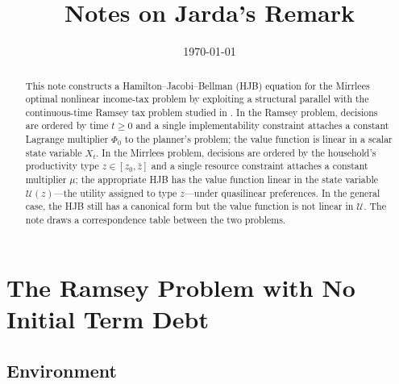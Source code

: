 \documentclass[12pt]{article}
\title{Notes on Jarda's Remark}
\date{\today}
\newcommand{\calU}{\mathcal{U}}
\begin{document}
\maketitle

\begin{abstract}
  This note constructs a Hamilton--Jacobi--Bellman (HJB) equation for the
  Mirrlees optimal nonlinear income-tax problem by exploiting a structural
  parallel with the continuous-time Ramsey tax problem studied in
  \citet{JiangSargentWang2024}.  In the Ramsey problem, decisions are ordered by
  time $t \ge 0$ and a single implementability constraint attaches a constant
  Lagrange multiplier $\Phi_0$ to the planner's problem; the value function is
  linear in a scalar state variable $X_t$.  In the Mirrlees problem, decisions
  are ordered by the household's productivity type $z \in [z_0, \bar{z}]$ and a
  single resource constraint attaches a constant multiplier $\mu$; the
  appropriate HJB has the value function linear in the state variable
  $\calU(z)$---the utility assigned to type $z$---under quasilinear
  preferences.  In the general case, the HJB still has a canonical form but
  the value function is not linear in $\calU$.  The note draws a
  correspondence table between the two problems.
\end{abstract}
%
%
\section{The Ramsey Problem with No Initial Term Debt}
\label{sec:ramsey}

\subsection{Environment}
\end{document}
